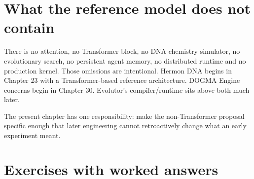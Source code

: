 \section{What the reference model does not contain}

There is no attention, no Transformer block, no DNA chemistry simulator, no
evolutionary search, no persistent agent memory, no distributed runtime and no
production kernel. Those omissions are intentional. Hermon DNA begins in Chapter 23
with a Transformer-based reference architecture. DOGMA Engine concerns begin in
Chapter 30. Evolutor's compiler/runtime sits above both much later.

The present chapter has one responsibility: make the non-Transformer proposal
specific enough that later engineering cannot retroactively change what an early
experiment meant.

\section{Exercises with worked answers}

